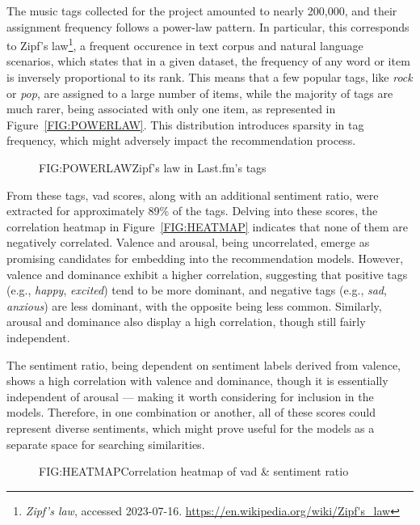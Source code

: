 The music tags collected for the project amounted to nearly 200,000, and their assignment frequency follows a power-law pattern. In particular, this corresponds to Zipf's law\footnote[1]{\emph{Zipf's law}, accessed 2023{-}07{-}16. \url{https://en.wikipedia.org/wiki/Zipf's_law}}, a frequent occurence in text corpus and natural language scenarios, which states that in a given dataset, the frequency of any word or item is inversely proportional to its rank. This means that a few popular tags, like \emph{rock} or \emph{pop}, are assigned to a large number of items, while the majority of tags are much rarer, being associated with only one item, as represented in Figure~\ref{FIG:POWERLAW}. This distribution introduces sparsity in tag frequency, which might adversely impact the recommendation process.

\begin{figure}[Zipf's law in Last.fm's tags]{FIG:POWERLAW}{Zipf's law in Last.fm's tags}
\end{figure}

From these tags, \acs{vad} scores, along with an additional sentiment ratio, were extracted for approximately 89\% of the tags. Delving into these scores, the correlation heatmap in Figure~\ref{FIG:HEATMAP} indicates that none of them are negatively correlated. Valence and arousal, being uncorrelated, emerge as promising candidates for embedding into the recommendation models. However, valence and dominance exhibit a higher correlation, suggesting that positive tags (e.g., \emph{happy}, \emph{excited}) tend to be more dominant, and negative tags (e.g., \emph{sad}, \emph{anxious}) are less dominant, with the opposite being less common. Similarly, arousal and dominance also display a high correlation, though still fairly independent.

The sentiment ratio, being dependent on sentiment labels derived from valence, shows a high correlation with valence and dominance, though it is essentially independent of arousal --- making it worth considering for inclusion in the models. Therefore, in one combination or another, all of these scores could represent diverse sentiments, which might prove useful for the models as a separate space for searching similarities.

\begin{figure}[Correlation heatmap of sentiment attributes]{FIG:HEATMAP}{Correlation heatmap of \acs{vad} \& sentiment ratio}
\end{figure}

